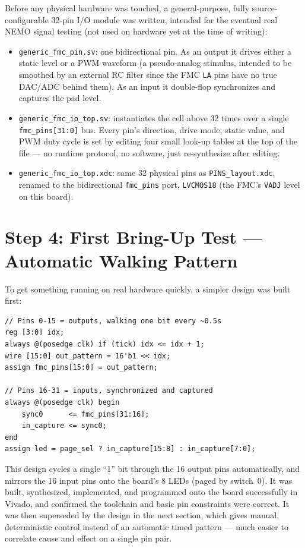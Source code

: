 \documentclass[11pt]{article}
\begin{document}
Before any physical hardware was touched, a general-purpose, fully source-configurable
32-pin I/O module was written, intended for the eventual real NEMO signal testing (not
used on hardware yet at the time of writing):

\begin{itemize}
    \item \texttt{generic\_fmc\_pin.sv}: one bidirectional pin. As an output it drives
    either a static level or a PWM waveform (a pseudo-analog stimulus, intended to be
    smoothed by an external RC filter since the FMC \texttt{LA} pins have no true DAC/ADC
    behind them). As an input it double-flop synchronizes and captures the pad level.
    \item \texttt{generic\_fmc\_io\_top.sv}: instantiates the cell above 32 times over a
    single \texttt{fmc\_pins[31:0]} bus. Every pin's direction, drive mode, static value,
    and PWM duty cycle is set by editing four small look-up tables at the top of the file
    --- no runtime protocol, no software, just re-synthesize after editing.
    \item \texttt{generic\_fmc\_io\_top.xdc}: same 32 physical pins as
    \texttt{PINS\_layout.xdc}, renamed to the bidirectional \texttt{fmc\_pins} port,
    \texttt{LVCMOS18} (the FMC's \texttt{VADJ} level on this board).
\end{itemize}

\section{Step 4: First Bring-Up Test --- Automatic Walking Pattern}

To get something running on real hardware quickly, a simpler design was built first:

\begin{lstlisting}[caption={Core logic of fmc\_loopback\_test.sv}]
// Pins 0-15 = outputs, walking one bit every ~0.5s
reg [3:0] idx;
always @(posedge clk) if (tick) idx <= idx + 1;
wire [15:0] out_pattern = 16'b1 << idx;
assign fmc_pins[15:0] = out_pattern;

// Pins 16-31 = inputs, synchronized and captured
always @(posedge clk) begin
    sync0      <= fmc_pins[31:16];
    in_capture <= sync0;
end
assign led = page_sel ? in_capture[15:8] : in_capture[7:0];
\end{lstlisting}

This design cycles a single ``1'' bit through the 16 output pins automatically, and
mirrors the 16 input pins onto the board's 8 LEDs (paged by switch~0). It was built,
synthesized, implemented, and programmed onto the board successfully in Vivado, and
confirmed the toolchain and basic pin constraints were correct. It was then superseded
by the design in the next section, which gives manual, deterministic control instead of
an automatic timed pattern --- much easier to correlate cause and effect on a single pin
pair.
\end{document}
